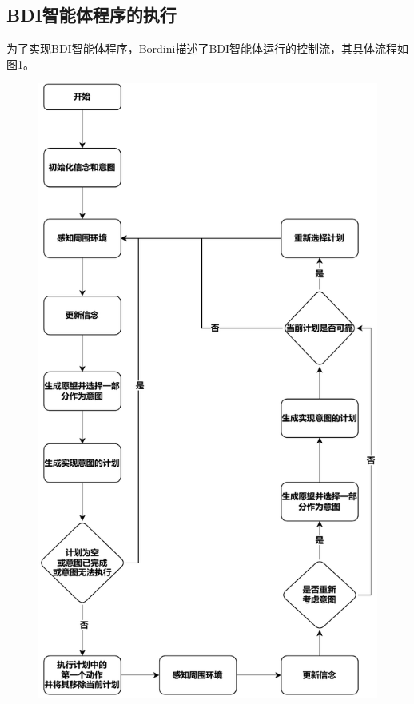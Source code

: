 \subsection{BDI智能体程序的执行}
为了实现BDI智能体程序，Bordini\cite{bordini2007programming}描述了BDI智能体运行的控制流，其具体流程如图\ref{fig:deliberation}。
\begin{figure}[htb]
\centering
\includegraphics[scale=0.6]{./figs/deliberation_cycle}
\label{fig:deliberation}
\end{figure}

